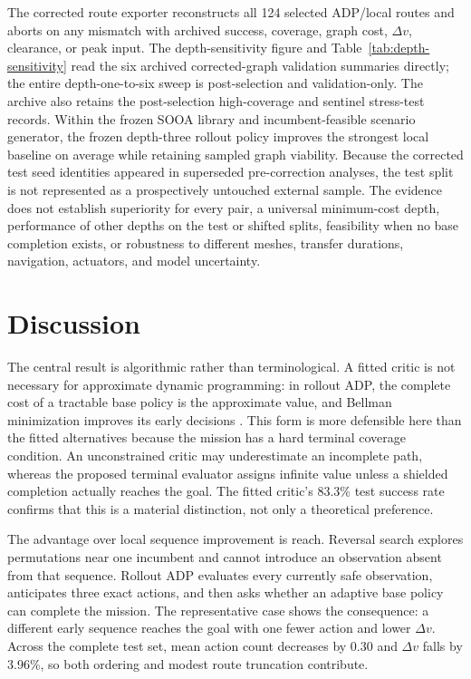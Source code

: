 \documentclass{IEEEtaes}
\theoremstyle{remark}
\theoremstyle{plain}
\begin{document}
The corrected route exporter reconstructs all 124 selected ADP/local routes and aborts on any mismatch with archived success, coverage, graph cost, $\Delta v$, clearance, or peak input. The depth-sensitivity figure and Table~\ref{tab:depth-sensitivity} read the six archived corrected-graph validation summaries directly; the entire depth-one-to-six sweep is post-selection and validation-only. The archive also retains the post-selection high-coverage and sentinel stress-test records. Within the frozen SOOA library and incumbent-feasible scenario generator, the frozen depth-three rollout policy improves the strongest local baseline on average while retaining sampled graph viability. Because the corrected test seed identities appeared in superseded pre-correction analyses, the test split is not represented as a prospectively untouched external sample. The evidence does not establish superiority for every pair, a universal minimum-cost depth, performance of other depths on the test or shifted splits, feasibility when no base completion exists, or robustness to different meshes, transfer durations, navigation, actuators, and model uncertainty.

\section{Discussion}
\label{sec:discussion}

The central result is algorithmic rather than terminological. A fitted critic is not necessary for approximate dynamic programming: in rollout ADP, the complete cost of a tractable base policy is the approximate value, and Bellman minimization improves its early decisions \cite{bertsekas2020rollout}. This form is more defensible here than the fitted alternatives because the mission has a hard terminal coverage condition. An unconstrained critic may underestimate an incomplete path, whereas the proposed terminal evaluator assigns infinite value unless a shielded completion actually reaches the goal. The fitted critic's 83.3\% test success rate confirms that this is a material distinction, not only a theoretical preference.

The advantage over local sequence improvement is reach. Reversal search explores permutations near one incumbent and cannot introduce an observation absent from that sequence. Rollout ADP evaluates every currently safe observation, anticipates three exact actions, and then asks whether an adaptive base policy can complete the mission. The representative case shows the consequence: a different early sequence reaches the goal with one fewer action and lower $\Delta v$. Across the complete test set, mean action count decreases by 0.30 and $\Delta v$ falls by 3.96\%, so both ordering and modest route truncation contribute.
\end{document}
